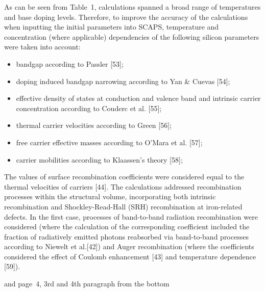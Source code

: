 \documentclass[a4paper,fleqn]{cas-sc}
\begin{document}
\begin{mdframed}
As can be seen from Table~1, calculations spanned a broad range of temperatures and base doping levels.
Therefore, to improve the accuracy of the calculations when inputting the initial parameters into SCAPS,
\textcolor[rgb]{1.00,0.07,0.00}{temperature and concentration (where applicable) dependencies of the following silicon parameters were taken into account}:

\begin{itemize}[itemsep=2pt, parsep=0pt, topsep=0pt]
    \item bandgap according to Passler [53];
    \item doping induced bandgap narrowing according to Yan \& Cuevas [54];
    \item effective density of states at conduction and valence band and intrinsic carrier concentration according to Couderc et al. [55];
    \item thermal carrier velocities according to Green [56];
    \item free carrier effective masses according to O’Mara et al. [57];
    \item carrier mobilities according to Klaassen's theory [58];
\end{itemize}

The values of surface recombination coefficients were considered equal to the thermal velocities of carriers [44].
The calculations addressed recombination processes within the structural volume,
incorporating both intrinsic recombination and Shockley-Read-Hall (SRH) recombination at iron-related defects.
In the first case, processes of band-to-band radiation recombination were considered
(where the calculation of the corresponding coefficient included the fraction of radiatively emitted photons
reabsorbed via band-to-band processes according to Niewelt et al.[42])
and Auger recombination (where the coefficients considered the effect of Coulomb enhancement [43] and
\textcolor[rgb]{1.00,0.07,0.00}{temperature dependence} [59]).
\end{mdframed}


and page~4, 3rd  and 4th paragraph from the bottom
\end{document}
